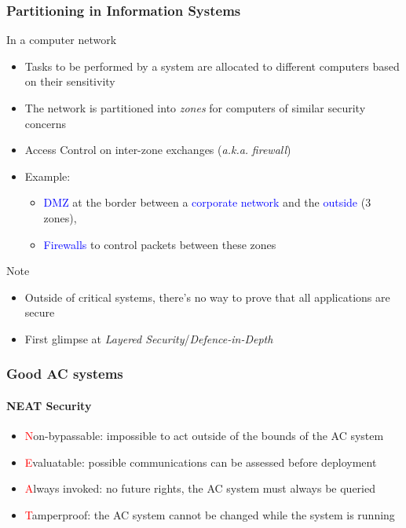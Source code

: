 \begin{reveals}
\begin{frame}
\end{frame}

\begin{frame}
  \frametitle{Partitioning in Information Systems}

  \vfill

  \begin{block}{In a computer network}
    \begin{itemize}
    \item Tasks to be performed by a system are allocated to different
      computers based on their sensitivity
    \item The network is partitioned into \emph{zones} for computers
      of similar security concerns
    \item Access Control on inter-zone exchanges (\textit{a.k.a.}
      \emph{firewall}) 
    \item Example:
      \begin{itemize}
      \item \textcolor{blue}{DMZ} at the border between a
        \textcolor{blue}{corporate network} and the
        \textcolor{blue}{outside} (3 zones), 
      \item \textcolor{blue}{Firewalls} to control packets between these zones
      \end{itemize}

    \end{itemize}
  \end{block}

  \vfill

  \begin{block}{Note}
    \begin{itemize}
    \item Outside of critical systems, there's no way to prove that
      all applications are secure
    \item First glimpse at \emph{Layered Security}/\emph{Defence-in-Depth}
    \end{itemize}
  \end{block}
\end{frame}




\begin{frame}
  \frametitle{Good AC systems}
  \framesubtitle{NEAT Security}

  \begin{itemize}[<+->]
  \item \textcolor{red}{N}on-bypassable: impossible to act outside of
    the bounds of the AC system
  \item \textcolor{red}{E}valuatable: possible communications can be
    assessed before deployment
  \item \textcolor{red}{A}lways invoked: no future rights, the AC
    system must always be queried
  \item \textcolor{red}{T}amperproof: the AC system cannot be changed
    while the system is running
  \end{itemize}
  

\end{frame}
\end{reveals}
